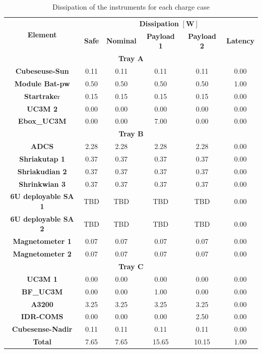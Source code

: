 \begin{table}[H]
    \centering
    \caption{Dissipation of the instruments for each charge case}
    \label{tab:dissipationUPMSat3}
    
\begin{tabular}{cccccc}
    \toprule \multirow{2}{*}{ \textbf{Element }} & \multicolumn{5}{c}{ \textbf{Dissipation} $[\mathbf{W}]$} \\
    \cline{2-6} & \textbf{Safe} & \textbf{Nominal} & \textbf{Payload 1} & \textbf{Payload 2} &\textbf{ Latency} \\
    \hline \multicolumn{6}{c}{ \textbf{Tray A }} \\
    \hline \textbf{Cubeseuse-Sun} & 0.11 & 0.11 & 0.11 & 0.11 & 0.00 \\
     \textbf{Module Bat-pw} & 0.50 & 0.50 & 0.50 & 0.50 & 1.00 \\
     \textbf{Startrake}r & 0.15 & 0.15 & 0.15 & 0.15 & 0.00 \\
     \textbf{UC3M 2} & 0.00 & 0.00 & 0.00 & 0.00 & 0.00 \\
     \textbf{Ebox\_UC3M} & 0.00 & 0.00 & 7.00 & 0.00 & 0.00 \\
    \hline \multicolumn{6}{c}{ \textbf{Tray B }} \\
    \hline \textbf{ADCS} & 2.28 & 2.28 & 2.28 & 2.28 & 0.00 \\
     \textbf{Shriakutap 1} & 0.37 & 0.37 & 0.37 & 0.37 & 0.00 \\
     \textbf{Shriakudian 2} & 0.37 & 0.37 & 0.37 & 0.37 & 0.00 \\
     \textbf{Shrinkwian 3} & 0.37 & 0.37 & 0.37 & 0.37 & 0.00 \\
     \textbf{6U deployable SA 1} & TBD & TBD & TBD & TBD & 0.00 \\
     \textbf{6U deployable SA 2} & TBD & TBD & TBD & TBD & 0.00 \\
     \textbf{Magnetometer 1} & 0.07 & 0.07 & 0.07 & 0.07 & 0.00 \\
     \textbf{Magnetometer 2} & 0.07 & 0.07 & 0.07 & 0.07 & 0.00 \\
    \hline \multicolumn{6}{c}{ \textbf{Tray C} } \\
    \hline \textbf{UC3M 1} & 0.00 & 0.00 & 0.00 & 0.00 & 0.00 \\
     \textbf{BF\_UC3M} & 0.00 & 0.00 & 1.00 & 0.00 & 0.00 \\
    \textbf{ A3200 }& 3.25 & 3.25 & 3.25 & 3.25 & 0.00 \\
      \textbf{IDR-COMS} & 0.00 & 0.00 & 0.00 & 2.50 & 0.00 \\
    \textbf{ Cubesense-Nadir} & 0.11 & 0.11 & 0.11 & 0.11 & 0.00 \\
     \hline \textbf{Total} & 7.65 & 7.65 & 15.65 & 10.15 & 1.00 \\
     \bottomrule
    
    \end{tabular}
    \end{table}

